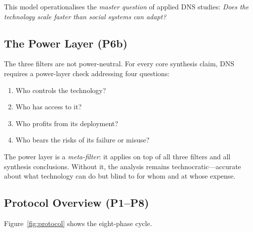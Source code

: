 \documentclass[10pt,a4paper]{article}
\begin{document}
This model operationalises the \textit{master question} of applied DNS studies:
\textit{Does the technology scale faster than social systems can adapt?}

\subsection{The Power Layer (P6b)}
\label{sec:powerlayer}

The three filters are not power-neutral. For every core synthesis claim, DNS requires
a power-layer check addressing four questions:
\begin{enumerate}[leftmargin=*, label=(\arabic*)]
  \item Who controls the technology?
  \item Who has access to it?
  \item Who profits from its deployment?
  \item Who bears the risks of its failure or misuse?
\end{enumerate}

The power layer is a \textit{meta-filter}: it applies on top of all three filters and
all synthesis conclusions. Without it, the analysis remains technocratic—accurate
about what technology can do but blind to for whom and at whose expense.

\subsection{Protocol Overview (P1--P8)}

Figure~\ref{fig:protocol} shows the eight-phase cycle.
\end{document}
